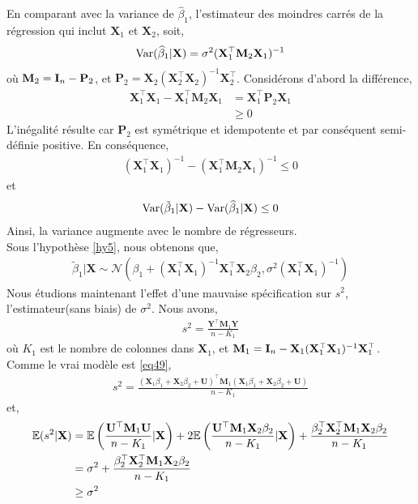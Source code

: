 En comparant avec la variance de $\widehat{\beta}_1$, l'estimateur des moindres carrés de la régression qui inclut $\mathbf{X}_1$ et $\mathbf{X}_2$, soit,
\begin{align*}
\mathrm{Var}(\widehat{\beta}_1|\mathbf{X}) = \sigma^2(\mathbf{X}_1^\top\mathbf{M}_2\mathbf{X}_1)^{-1}
\end{align*}
où $\mathbf{M}_2 = \mathbf{I}_n - \mathbf{P}_2$, et $ \mathbf{P}_2 = \mathbf{X}_2(\mathbf{X}_2^\top\mathbf{X}_2)^{-1}\mathbf{X}_2^\top$. Considérons d'abord la différence,
\begin{align*}
\mathbf{X}_1^\top\mathbf{X}_1-\mathbf{X}_1^\top\mathbf{M}_2\mathbf{X}_1 &= \mathbf{X}_1^\top\mathbf{P}_2\mathbf{X}_1\\
&\geq 0
\end{align*}
L'inégalité résulte car $\mathbf{P}_2$ est symétrique et idempotente et par conséquent semi-définie positive. En conséquence,
\begin{align*}
(\mathbf{X}_1^\top\mathbf{X}_1)^{-1} - (\mathbf{X}_1^\top\mathbf{M}_2\mathbf{X}_1)^{-1} \leq 0
\end{align*}
et
\begin{align*}
\mathrm{Var}(\tilde{\beta}_1|\mathbf{X}) - \mathrm{Var}(\widehat{\beta}_1|\mathbf{X}) \leq 0
\end{align*}
Ainsi, la variance augmente avec le nombre de régresseurs.\\
Sous l'hypothèse \ref{hy5}, nous obtenons que,
\begin{align*}
\tilde{\beta}_1 | \mathbf{X} \sim \mathcal{N}\left(\beta_1 + (\mathbf{X}_1^\top\mathbf{X}_1)^{-1}\mathbf{X}_1^\top\mathbf{X}_2\beta_2, \sigma^2(\mathbf{X}_1^\top\mathbf{X}_1)^{-1}\right)
\end{align*}
Nous étudions maintenant l'effet d'une mauvaise spécification sur $s^2$, l'estimateur(sans biais) de $\sigma^2$. Nous avons,
\begin{align*}
s^2 = \frac{\mathbf{Y}^\top\mathbf{M}_1\mathbf{Y}}{n-K_1}
\end{align*}
où $K_1$ est le nombre de colonnes dans $\mathbf{X}_1$, et $\mathbf{M}_1 = \mathbf{I}_n - \mathbf{X}_1(\mathbf{X}_1^\top\mathbf{X}_1)^{-1}\mathbf{X}_1^\top$. Comme le vrai modèle est \eqref{eq49},
\begin{align*}
s^2 = \frac{(\mathbf{X}_1\beta_1 + \mathbf{X}_2\beta_2 + \mathbf{U})^\top\mathbf{M}_1(\mathbf{X}_1\beta_1 + \mathbf{X}_2\beta_2 + \mathbf{U})}{n-K_1}
\end{align*}
et,
\begin{align*}
\mathbb{E}(s^2|\mathbf{X}) &=\mathbb{E}\left(\frac{\mathbf{U}^\top\mathbf{M}_1\mathbf{U}}{n-K_1}|\mathbf{X}\right) + 2\mathbb{E}\left(\frac{\mathbf{U}^\top\mathbf{M}_1\mathbf{X}_2\beta_2}{n-K_1}| \mathbf{X}\right) +
\frac{\beta_2^\top\mathbf{X}_2^\top\mathbf{M}_1\mathbf{X}_2\beta_2}{n-K_1}\\
&=\sigma^2 + \frac{\beta_2^\top\mathbf{X}_2^\top\mathbf{M}_1\mathbf{X}_2\beta_2}{n-K_1}\\
&\geq \sigma^2
\end{align*}
